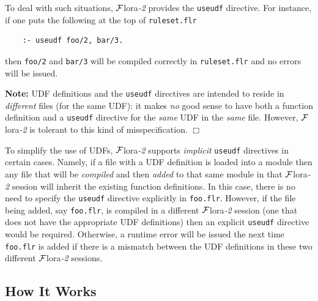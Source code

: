 \documentclass[11pt]{article}
\newcommand{\FLORA}{{\mbox{\sc ${\cal F}${lora}\rm\emph{-2}}}\xspace}
\begin{document}
To deal with such situations, \FLORA provides the \texttt{useudf}
directive. For instance, if one puts the following at the top of
\texttt{ruleset.flr}
\begin{verbatim}
    :- useudf foo/2, bar/3.
\end{verbatim}
then \texttt{foo/2} and \texttt{bar/3}
will be compiled correctly in \texttt{ruleset.flr} and
no errors will be issued. 

\noindent
\textbf{Note:} UDF definitions and the \texttt{useudf} directives are intended
to reside in \emph{different} files (for the same UDF):
it makes \emph{no} good sense to have both a function definition and a
\texttt{useudf} directive for the \emph{same} UDF in the \emph{same}
file. However, \FLORA is tolerant to this kind of misspecification.
\hfill$\Box$

To simplify the use of UDFs, \FLORA supports \emph{implicit}
\texttt{useudf} directives in certain cases. Namely, if a file with
a UDF definition is loaded into a module then any file that will be
\emph{compiled} and then \emph{added} to that same module in that \FLORA session
will inherit the existing function definitions. In this case, there is no
need to specify the \texttt{useudf} directive explicitly in
\texttt{foo.flr}.
However, if the file being added, say \texttt{foo.flr},
is compiled in a different \FLORA session
(one that does not have the appropriate UDF definitions) then an explicit
\texttt{useudf} directive would be required. Otherwise, a runtime
error will be issued the next time \texttt{foo.flr} is added if there is a
mismatch between the UDF definitions in these two different \FLORA sessions. 


\subsection{How It Works}
\end{document}
